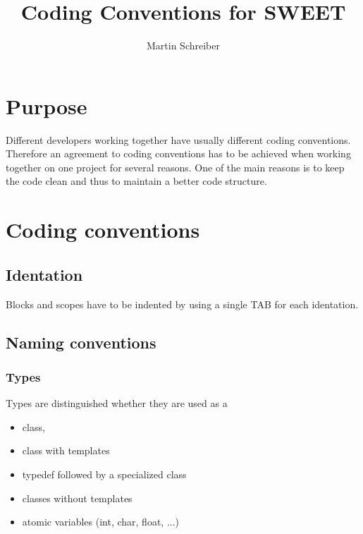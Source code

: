 \documentclass[10pt,a4paper]{article}
\author{Martin Schreiber}
\title{Coding Conventions for SWEET}
\begin{document}
\maketitle

\section{Purpose}
Different developers working together have usually different coding conventions.
Therefore an agreement to coding conventions has to be achieved when working together on one project for several reasons.
One of the main reasons is to keep the code clean and thus to maintain a better code structure.


\section{Coding conventions}

\subsection{Identation}
Blocks and scopes have to be indented by using a single TAB for each identation.

\subsection{Naming conventions}

\subsubsection{Types}

Types are distinguished whether they are used as a
\begin{itemize}
	\item class,
	\item class with templates
	\item typedef followed by a specialized class
	\item classes without templates
	\item atomic variables (int, char, float, ...)
\end{itemize}


\end{document}
